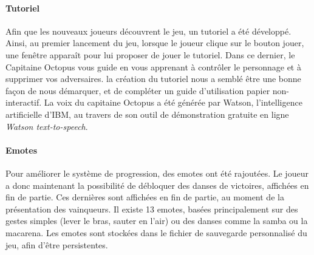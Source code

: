 		\paragraph{Tutoriel}

			Afin que les nouveaux joueurs découvrent le jeu, un tutoriel a été développé. Ainsi, au premier lancement du jeu, lorsque le 
			joueur clique sur le bouton jouer, une fenêtre apparaît pour lui proposer de jouer le tutoriel. Dans ce dernier, le Capitaine Octopus vous guide 
			en vous apprenant à contrôler le personnage et à supprimer vos adversaires. la création du tutoriel nous a semblé être une bonne façon de nous 
			démarquer, et de compléter un guide d'utilisation papier non-interactif.
			La voix du capitaine Octopus a été générée par Watson, l'intelligence artificielle d'IBM, au travers de son outil de démonstration gratuite 
			en ligne \textit{Watson text-to-speech}.


		\paragraph{Emotes}

			Pour améliorer le système de progression, des emotes ont été rajoutées. Le joueur a donc maintenant la possibilité de débloquer des 
			danses de victoires, affichées en fin de partie. Ces dernières sont affichées en fin de partie, au moment de la présentation des vainqueurs. 
			Il existe 13 emotes, basées principalement sur des gestes simples (lever le bras, sauter en l'air) ou des danses comme la samba ou la macarena. 
			Les emotes sont stockées dans le fichier de sauvegarde personnalisé du jeu, afin d'être persistentes.
